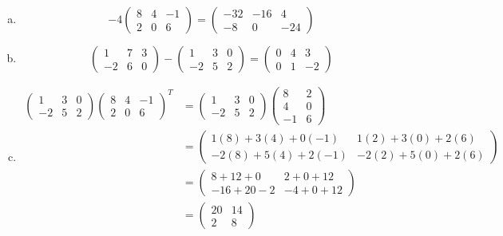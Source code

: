 \documentclass[11pt,letterpaper]{article}
\begin{document}
\sol 
\begin{enumerate}[(a)]
\item 
	\[
	-4 \begin{pmatrix} 8 & 4 & -1 \\ 2 & 0 & 6 \end{pmatrix}= \begin{pmatrix} -32 & -16 & 4 \\ -8 & 0 & -24 \end{pmatrix}
	\]

\item 
	\[
	\begin{pmatrix} 1 & 7 & 3 \\ -2 & 6 & 0 \end{pmatrix} - \begin{pmatrix} 1 & 3 & 0 \\ -2 & 5 & 2 \end{pmatrix}= \begin{pmatrix} 0 & 4 & 3 \\ 0 & 1 & -2 \end{pmatrix}
	\]

\item 
	\[
	\begin{aligned}
	\begin{pmatrix} 1 & 3 & 0 \\ -2 & 5 & 2 \end{pmatrix} \begin{pmatrix} 8 & 4 & -1 \\ 2 & 0 & 6 \end{pmatrix}^T&= \begin{pmatrix} 1 & 3 & 0 \\ -2 & 5 & 2 \end{pmatrix} \begin{pmatrix} 8 & 2 \\ 4 & 0 \\ -1 & 6 \end{pmatrix} \\[0.3cm]
	&= \begin{pmatrix} 1(8) + 3(4) + 0(-1) & 1(2) + 3(0) + 2(6) \\ -2(8) + 5(4) + 2(-1) & -2(2) + 5(0) + 2(6) \end{pmatrix} \\[0.3cm]
	&= \begin{pmatrix} 8 + 12 + 0 & 2 + 0 + 12 \\ -16 + 20 - 2 & -4 + 0 + 12 \end{pmatrix} \\[0.3cm]
	&= \begin{pmatrix} 20 & 14 \\ 2 & 8 \end{pmatrix}
	\end{aligned}
	\]
\end{enumerate}
\end{document}
